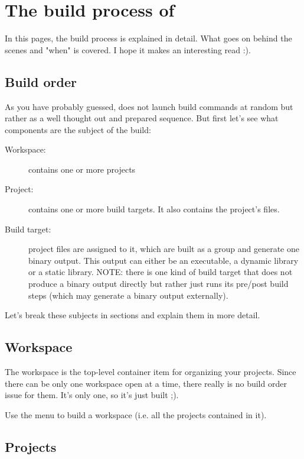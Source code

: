 \section{The build process of \codeblocks}\label{sec:build_process}

In this pages, the build process is explained in detail. What goes on behind the scenes and "when" is covered. I hope it makes an interesting read :).
 
\subsection{Build order}

As you have probably guessed, \codeblocks does not launch build commands at random but rather as a well thought out and prepared sequence. But first let's see what components are the subject of the build:

\begin{description}
\item[Workspace:] contains one or more projects
\item[Project:] contains one or more build targets. It also contains the project's files.
\item[Build target:] project files are assigned to it, which are built as a group and generate one binary output. This output can either be an executable, a dynamic library or a static library. NOTE: there is one kind of build target that does not produce a binary output directly but rather just runs its pre/post build steps (which may generate a binary output externally).
\end{description}

Let's break these subjects in sections and explain them in more detail.

\subsection{Workspace}

The workspace is the top-level container item for organizing your projects. Since there can be only one workspace open at a time, there really is no build order issue for them. It's only one, so it's just built ;).

Use the menu  to build a workspace (i.e. all the projects contained in it). 

\subsection{Projects}


